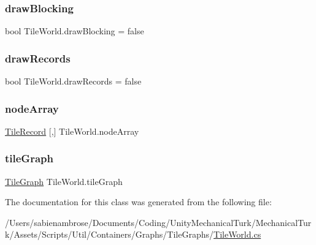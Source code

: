 \subsubsection{\texorpdfstring{draw\+Blocking}{drawBlocking}}
{\footnotesize\ttfamily bool Tile\+World.\+draw\+Blocking = false}

\mbox{\label{class_tile_world_af3b21e656a6ba363f41fe128a7e02be2}} 
\subsubsection{\texorpdfstring{draw\+Records}{drawRecords}}
{\footnotesize\ttfamily bool Tile\+World.\+draw\+Records = false}

\mbox{\label{class_tile_world_a8f7c8f36d84d1bd4086078e690a08ce3}} 
\subsubsection{\texorpdfstring{node\+Array}{nodeArray}}
{\footnotesize\ttfamily \mbox{\hyperlink{struct_tile_record}{Tile\+Record}} \mbox{[},\mbox{]} Tile\+World.\+node\+Array}

\mbox{\label{class_tile_world_af281625545d4b1aaeaf5053a62b1d519}} 
\subsubsection{\texorpdfstring{tile\+Graph}{tileGraph}}
{\footnotesize\ttfamily \mbox{\hyperlink{class_tile_graph}{Tile\+Graph}} Tile\+World.\+tile\+Graph}



The documentation for this class was generated from the following file\+:\begin{DoxyCompactItemize}
\item 
/\+Users/sabienambrose/\+Documents/\+Coding/\+Unity\+Mechanical\+Turk/\+Mechanical\+Turk/\+Assets/\+Scripts/\+Util/\+Containers/\+Graphs/\+Tile\+Graphs/\mbox{\hyperlink{_tile_world_8cs}{Tile\+World.\+cs}}\end{DoxyCompactItemize}
